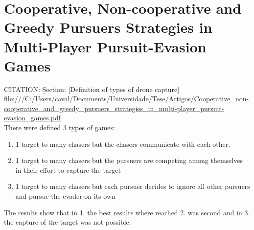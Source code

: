 \section{Cooperative, Non-cooperative and Greedy Pursuers Strategies in Multi-Player Pursuit-Evasion Games}\label{Cooperative, Non-cooperative and Greedy Pursuers Strategies in Multi-Player Pursuit-Evasion Games}

CITATION: \cite{8062755} \b{Section: [Definition of types of drone capture]}\\
\url{file:///C:/Users/caval/Documents/Universidade/Tese/Artigos/Cooperative_non-cooperative_and_greedy_pursuers_strategies_in_multi-player_pursuit-evasion_games.pdf}\\

There were defined 3 types of games:
\begin{enumerate}
\item 1 target to many chasers but the chasers communicate with each other.
\item 1 target to many chasers but the pursuers are competing among themselves in their effort to capture the target
\item 1 target to many chasers but each pursuer decides to ignore all other pursuers and pursue the evader on its own 
\end{enumerate}

The results show that in 1. the best results where reached 2. was second and in 3. the capture of the target was not possible.